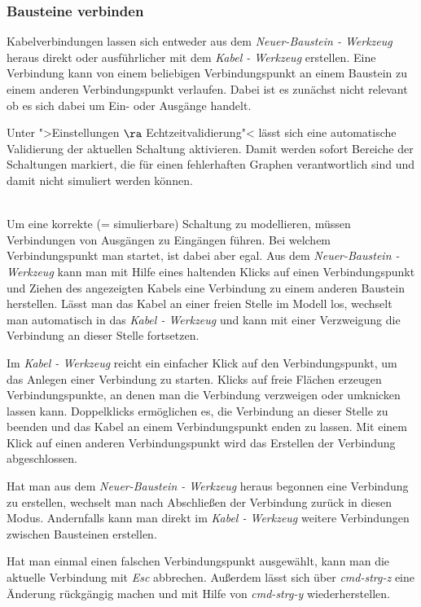 \documentclass[12pt,a4paper]{scrartcl}
\newcommand{\fckNewBrickTool}{Neuer-Baustein - Werkzeug\xspace}
\newcommand{\fckWireTool}{Kabel - Werkzeug\xspace}
\begin{document}
\subsubsection{Bausteine verbinden}
Kabelverbindungen lassen sich entweder aus dem \textit{\fckNewBrickTool} heraus direkt oder ausführlicher mit dem \textit{\fckWireTool} erstellen. Eine Verbindung kann von einem beliebigen Verbindungspunkt an einem Baustein zu einem anderen Verbindungspunkt verlaufen. Dabei ist es zunächst nicht relevant ob es sich dabei um Ein- oder Ausgänge handelt.
\begin{info}
	Unter ">Einstellungen $\ra$ Echtzeitvalidierung"< lässt sich eine automatische Validierung der aktuellen Schaltung aktivieren. Damit werden sofort Bereiche der Schaltungen markiert, die für einen fehlerhaften Graphen verantwortlich sind und damit nicht simuliert werden können.
\end{info} \\
Um eine korrekte (= simulierbare) Schaltung zu modellieren, müssen Verbindungen von Ausgängen zu Eingängen führen. Bei welchem Verbindungspunkt man startet, ist dabei aber egal. Aus dem \textit{\fckNewBrickTool} kann man mit Hilfe eines haltenden Klicks auf einen Verbindungspunkt und Ziehen des angezeigten Kabels eine Verbindung zu einem anderen Baustein herstellen. Lässt man das Kabel an einer freien Stelle im Modell los, wechselt man automatisch in das \textit{\fckWireTool} und kann mit einer Verzweigung die Verbindung an dieser Stelle fortsetzen.

Im \textit{\fckWireTool} reicht ein einfacher Klick auf den Verbindungspunkt, um das Anlegen einer Verbindung zu starten. Klicks auf freie Flächen erzeugen Verbindungspunkte, an denen man die Verbindung verzweigen oder umknicken lassen kann. Doppelklicks ermöglichen es, die Verbindung an dieser Stelle zu beenden und das Kabel an einem Verbindungspunkt enden zu lassen. Mit einem Klick auf einen anderen Verbindungspunkt wird das Erstellen der Verbindung abgeschlossen.

Hat man aus dem \textit{\fckNewBrickTool} heraus begonnen eine Verbindung zu erstellen, wechselt man nach Abschließen der Verbindung zurück in diesen Modus. Andernfalls kann man direkt im \textit{Kabel - Werkzeug} weitere Verbindungen zwischen Bausteinen erstellen.
\begin{info}
	Hat man einmal einen falschen Verbindungspunkt ausgewählt, kann man die aktuelle Verbindung mit \textit{Esc} abbrechen. Außerdem lässt sich über \textit{\gls{cmd-strg-z}} eine Änderung rückgängig machen und mit Hilfe von \textit{\gls{cmd-strg-y}} wiederherstellen.
\end{info}
\end{document}
